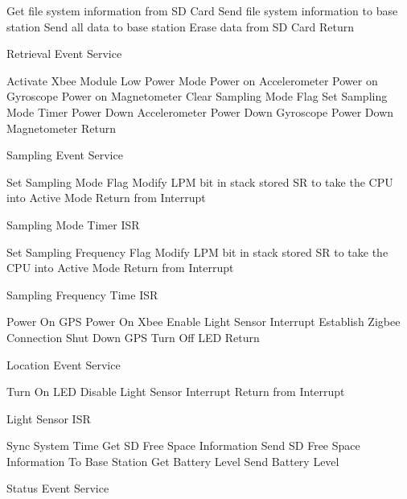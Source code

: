\begin{algorithm}
\SetAlgoNoLine
Get file system information from SD Card\;
Send file system information to base station\;
Send all data to base station\;
Erase data from SD Card
Return\;
\caption{Retrieval Event Service}
\end{algorithm}

\begin{algorithm}
\SetAlgoNoLine
Activate Xbee Module Low Power Mode\;
Power on Accelerometer\;
Power on Gyroscope\;
Power on Magnetometer\;
Clear Sampling Mode Flag\;
Set Sampling Mode Timer\;
Power Down Accelerometer\;
Power Down Gyroscope\;
Power Down Magnetometer\;
Return\;
\caption{Sampling Event Service}
\end{algorithm}

\begin{algorithm}
\SetAlgoNoLine
Set Sampling Mode Flag\;
Modify LPM bit in stack stored SR to take the CPU into Active Mode\;
Return from Interrupt\;
\caption{Sampling Mode Timer ISR}
\end{algorithm}

\begin{algorithm}
\SetAlgoNoLine
Set Sampling Frequency Flag\;
Modify LPM bit in stack stored SR to take the CPU into Active Mode\;
Return from Interrupt\;
\caption{Sampling Frequency Time ISR}
\end{algorithm}

\begin{algorithm}
\SetAlgoNoLine
Power On GPS\;
Power On Xbee\;
Enable Light Sensor Interrupt\;
Establish Zigbee Connection\;
Shut Down GPS\;
Turn Off LED\;
Return\;
\caption{Location Event Service}
\end{algorithm}

\begin{algorithm}
\SetAlgoNoLine
Turn On LED\;
Disable Light Sensor Interrupt\;
Return from Interrupt\;
\caption{Light Sensor ISR}
\end{algorithm}

\begin{algorithm}
\SetAlgoNoLine
Sync System Time\;
Get SD Free Space Information\;
Send SD Free Space Information To Base Station\;
Get Battery Level\;
Send Battery Level\;
\caption{Status Event Service}
\end{algorithm}
